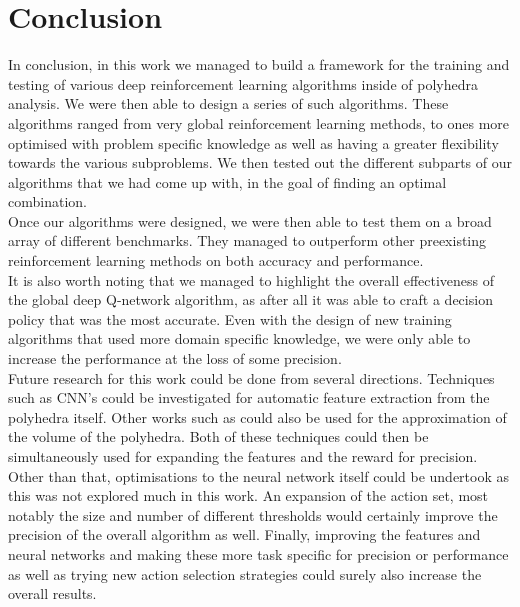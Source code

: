 
\chapter{Conclusion}
In conclusion, in this work we managed to build a framework for the training and testing of various deep reinforcement learning algorithms inside of polyhedra analysis. We were then able to design a series of such algorithms. These algorithms ranged from very global reinforcement learning methods, to ones more optimised with problem specific knowledge as well as having a greater flexibility towards the various subproblems. We then tested out the different subparts of our algorithms that we had come up with, in the goal of finding an optimal combination.\\
Once our algorithms were designed, we were then able to test them on a broad array of different benchmarks. They managed to outperform other preexisting reinforcement learning methods on both accuracy and performance.\\
It is also worth noting that we managed to highlight the overall effectiveness of the global deep Q-network algorithm, as after all it was able to craft a decision policy that was the most accurate. Even with the design of new training algorithms that used more domain specific knowledge, we were only able to increase the performance at the loss of some precision.\\
Future research for this work could be done from several directions. Techniques such as CNN's could be investigated for automatic feature extraction from the polyhedra itself. Other works such as \cite{dyer1991random, kim2004fast} could also be used for the approximation of the volume of the polyhedra. Both of these techniques could then be simultaneously used for expanding the features and the reward for precision. Other than that, optimisations to the neural network itself could be undertook as this was not explored much in this work. An expansion of the action set, most notably the size and number of different thresholds would certainly improve the precision of the overall algorithm as well. Finally, improving the features and neural networks and making these more task specific for precision or performance as well as trying new action selection strategies could surely also increase the overall results. 
